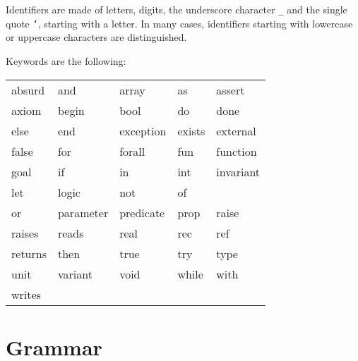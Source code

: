 \documentclass[a4paper,12pt]{report}
\begin{document}
Identifiers are made of letters, digits,
the underscore character \texttt{\_} and the single quote \texttt{'},
starting with a letter. In many cases, identifiers starting with
lowercase or uppercase characters are distinguished.

\begin{center}\end{center}

Keywords are the following:
\begin{center}
{\tt\begin{tabular}{l@{\qquad}l@{\qquad}l@{\qquad}l@{\qquad}l}
        absurd &
	and &
        array &
	as &
	assert \\
	axiom &
	begin &
        bool &
	do &
	done \\
        else &
	end &
	exception &
	exists &
	external \\
        false &
	for &
	forall &
	fun &
	function \\
	goal &
	if &
	in &
	int &
	invariant \\
	let &
	logic &
	not &
	of \\
	or &
	parameter &
	predicate &
	prop &
	raise \\
	raises &
	reads &
	real &
	rec &
	ref \\
	returns &
	then &
	true &
	try &
	type \\
	unit &
	variant &
	void &
	while &
	with \\
        writes &
\end{tabular}}
\end{center}

\section{Grammar}
\end{document}
